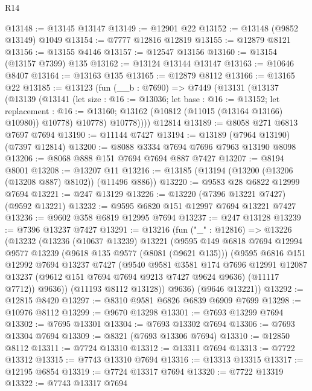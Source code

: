 \begin{lexlean}{R14}
\begin{coremodule}
@13148 := @13145 @13147
@13149 := @12901 @22
@13152 := @13148 (@9852 @13149) @1049
@13154 := @7777 @12816 @12819
@13155 := @12879 @8121
@13156 := @13155 @4146
@13157 := @12547 @13156
@13160 := @13154 (@13157 @7399) @135
@13162 := @13124 @13144 @13147
@13163 := @10646 @8407
@13164 := @13163 @135
@13165 := @12879 @8112
@13166 := @13165 @22
@13185 := @13123
    (fun (__b : @7690) =>
    @7449
      (@13131
        (@13137
          (@13139
            (@13141
              (let size : @16 := @13036;
              let base : @16 := @13152;
              let replacement : @16 := @13160;
              @13162 (@10812 (@11015 (@13164 @13166) @10980)) @10778)
              @10778)
            @10778))))
    @12814
@13189 := @8058 @271 @6813 @7697 @7694
@13190 := @11144 @7427
@13194 := @13189 (@7964 @13190) (@7397 @12814)
@13200 := @8088 @3334 @7694 @7696 @7963 @13190 @8098
@13206 := @8068 @888 @151 @7694 @7694 @887 @7427
@13207 := @8194 @8001
@13208 := @13207 @11
@13216 := @13185 (@13194 (@13200 (@13206 (@13208 @887) @8102)) (@11496 @886))
@13220 := @9583 @28 @6822 @12999 @7694
@13221 := @247 @13129
@13226 := @13220 (@7396 @13221 @7427) (@9592 @13221)
@13232 := @9595 @6820 @151 @12997 @7694 @13221 @7427
@13236 := @9602 @358 @6819 @12995 @7694
@13237 := @247 @13128
@13239 := @7396 @13237 @7427
@13291 := @13216
    (fun ("_" : @12816) =>
    @13226
      (@13232
        (@13236
          (@10637 @13239)
          @13221
          (@9595
            @149
            @6818
            @7694
            @12994
            @9577
            @13239
            (@9618 @135 @9577 (@8081 (@9621 @135)))
            (@9595
              @6816
              @151
              @12992
              @7694
              @13237
              @7427
              (@9540
                @9581
                @3581
                @174
                @7696
                @12991
                @12087
                @13237
                (@9612 @151 @7694 @7694 @9213 @7427 @9624 @9636)
                (@11117 @7712))
              @9636))
          (@11193 @8112 @13128))
        @9636)
      (@9646 @13221))
@13292 := @12815 @8420
@13297 := @8310 @9581 @6826 @6839 @6909 @7699
@13298 := @10976 @8112
@13299 := @9670 @13298
@13301 := @7693 @13299 @7694
@13302 := @7695 @13301
@13304 := @7693 @13302 @7694
@13306 := @7693 @13304 @7694
@13309 := @8321 (@7693 @13306 @7694)
@13310 := @12850 @8112
@13311 := @7724 @13310
@13312 := @13311 @7694
@13313 := @7722 @13312
@13315 := @7743 @13310 @7694
@13316 := @13313 @13315
@13317 := @12195 @6854
@13319 := @7724 @13317 @7694
@13320 := @7722 @13319
@13322 := @7743 @13317 @7694

\end{coremodule}
\end{lexlean}
